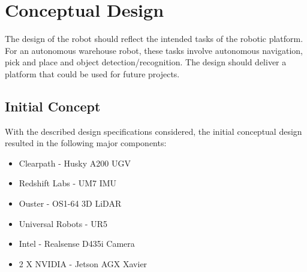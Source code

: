 

\section{Conceptual Design}\label{sec:M:ConceptualDesign}
The design of the robot should reflect the intended tasks of the robotic platform. For an autonomous warehouse robot, these tasks involve autonomous navigation, pick and place and object detection/recognition. The design should deliver a platform that could be used for future projects. 


\subsection{Initial Concept} \label{sec:M:CD:InitialConcept}
With the described design specifications considered, the initial conceptual design resulted in the following major components:

\begin{itemize}
    \item Clearpath - Husky A200 UGV
    \item Redshift Labs - UM7 IMU
    \item Ouster -  OS1-64 3D LiDAR
    \item Universal Robots - UR5
    \item Intel - Realsense D435i Camera
    \item 2 X NVIDIA - Jetson AGX Xavier
\end{itemize}

